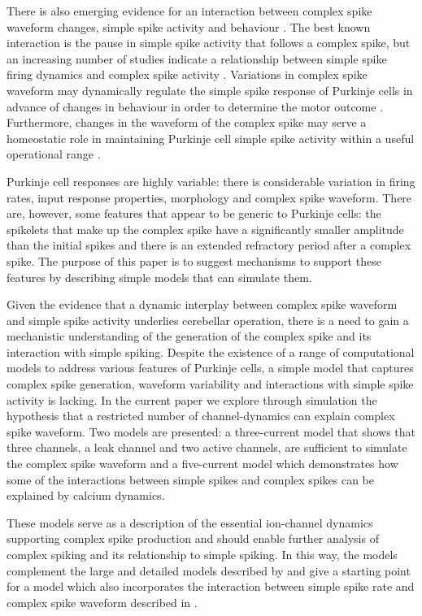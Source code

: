 \documentclass[twocolumn]{svjour3}          %
\begin{document}
There is also emerging evidence for an interaction between complex
spike waveform changes, simple spike activity and behaviour
\citep{YangLispberger2014,StrengEtAl2017}. The best known interaction
is the pause in simple spike activity that follows a complex spike, but
an increasing number of studies indicate a relationship between simple
spike firing dynamics and complex spike activity
\citep{Mano1970,Gilbert1976,CampbellHesslow1986,HashimotoKano1998,ServaisEtAl2004,MarutaEtAl2007,WarnaarEtAl2015,BurroughsEtAl2016}.
Variations in complex spike waveform may dynamically regulate the
simple spike response of Purkinje cells in advance of changes in
behaviour in order to determine the motor outcome
\citep{StrengEtAl2017}. Furthermore, changes in the waveform of the
complex spike may serve a homeostatic role in maintaining Purkinje
cell simple spike activity within a useful operational range
\citep{BurroughsEtAl2016}.

Purkinje cell responses are highly variable: there is considerable
variation in firing rates, input response properties, morphology and
complex spike waveform. There are, however, some features that appear
to be generic to Purkinje cells: the spikelets that make up the
complex spike have a significantly smaller amplitude than the initial
spikes and there is an extended refractory period after a complex
spike. The purpose of this paper is to suggest mechanisms to support
these features by describing simple models that can simulate them.

Given the evidence that a dynamic interplay between complex spike
waveform and simple spike activity underlies cerebellar operation,
there is a need to gain a mechanistic understanding of the generation
of the complex spike and its interaction with simple spiking. Despite
the existence of a range of computational models to address various
features of Purkinje cells, a simple model that captures complex spike
generation, waveform variability and interactions with simple spike
activity is lacking. In the current paper we explore through
simulation the hypothesis that a restricted number of channel-dynamics
can explain complex spike waveform. Two models are presented: a
three-current model that shows that three channels, a leak channel and
two active channels, are sufficient to simulate the complex spike
waveform and a five-current model which demonstrates how some of the
interactions between simple spikes and complex spikes can be explained
by calcium dynamics.

These models serve as a description of the essential ion-channel
dynamics supporting complex spike production and should enable further
analysis of complex spiking and its relationship to simple spiking. In
this way, the models complement the large and detailed models
described by \citet{VeysEtAl2013,ZangEtAl2018} and give a starting
point for a model which also incorporates the interaction between
simple spike rate and complex spike waveform described in
\citet{BurroughsEtAl2016}.
\end{document}
